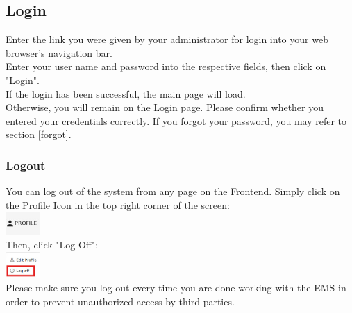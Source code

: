 \documentclass[twoside,a4paper]{refart}
\begin{document}
    \subsection{Login}
  	Enter  the link you were given by your administrator for login into 	your web browser's navigation bar. \\
    Enter your user name and password into the respective fields, then 		click on "Login". \\
    If the login has been successful, the main page will load. \\
    Otherwise, you will remain on the Login page. Please confirm 			whether you entered your credentials correctly. If you forgot your 		password, you may refer to section \ref{forgot}.
    \subsubsection{Logout}
    You can log out of the system from any page on the Frontend. Simply click on the Profile Icon in the top right corner of the screen: \\
  \includegraphics[width=50px]{profile.jpeg} \\
  Then, click "Log Off": \\
  \includegraphics[width=50px]{logoff.jpeg} \\
    Please make sure you log out every time you are done working with the EMS in order to prevent unauthorized access by third parties.
  
\end{document}
